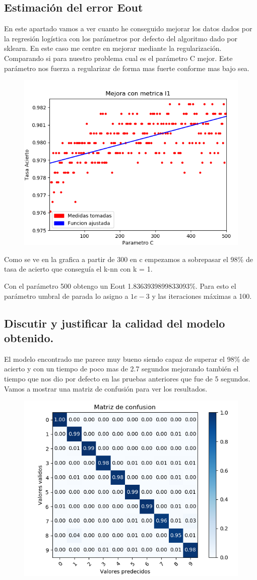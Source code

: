 \documentclass[titlepage]{article}
\begin{document}
\subsection{Estimación del error Eout}
En este apartado vamos a ver cuanto he conseguido mejorar los datos dados por la regresión logística con los parámetros por defecto del algoritmo dado por sklearn.
En este caso me centre en mejorar mediante la regularización. Comparando si para nuestro problema cual es el parámetro C mejor. Este parámetro nos fuerza a regularizar de forma mas fuerte conforme mas bajo sea. 
\begin{figure}[H]
	\centering
	\includegraphics[width=0.7\linewidth]{screenshot007}
\end{figure}
Como se ve en la grafica a partir  de 300 en c empezamos a sobrepasar el 98\% de tasa de acierto que conseguía el k-nn con k = 1.

Con el parámetro 500 obtengo un Eout 1.8363939899833093\%.
Para esto el parámetro umbral de parada lo asigno a $1e-3$ y las iteraciones máximas a 100.

\subsection{Discutir y justificar la calidad del modelo obtenido.}
El modelo encontrado me parece muy bueno siendo capaz de superar el 98\% de acierto y con un tiempo de poco mas de 2.7 segundos mejorando también el tiempo que nos dio por defecto en las pruebas anteriores que fue de 5 segundos.
Vamos a mostrar una matriz de confusión para ver los resultados.
\begin{figure}[H]
	\centering
	\includegraphics[width=0.7\linewidth]{screenshot009}

\end{figure}
\end{document}
